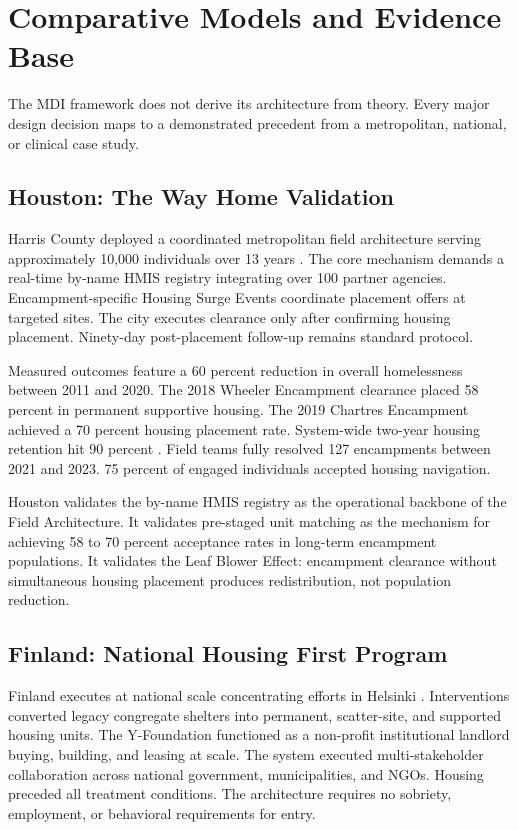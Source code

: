 \documentclass[12pt, letterpaper]{article}
\begin{document}
\clearpage
\section{Comparative Models and Evidence Base}

The MDI framework does not derive its architecture from theory. Every major design decision maps to a demonstrated precedent from a metropolitan, national, or clinical case study.

\subsection{Houston: The Way Home Validation}

Harris County deployed a coordinated metropolitan field architecture serving approximately 10,000 individuals over 13 years \citep{houston_way_home_2024}. The core mechanism demands a real-time by-name HMIS registry integrating over 100 partner agencies. Encampment-specific Housing Surge Events coordinate placement offers at targeted sites. The city executes clearance only after confirming housing placement. Ninety-day post-placement follow-up remains standard protocol.

Measured outcomes feature a 60 percent reduction in overall homelessness between 2011 and 2020. The 2018 Wheeler Encampment clearance placed 58 percent in permanent supportive housing. The 2019 Chartres Encampment achieved a 70 percent housing placement rate. System-wide two-year housing retention hit 90 percent \citep{houston_way_home_2024}. Field teams fully resolved 127 encampments between 2021 and 2023. 75 percent of engaged individuals accepted housing navigation.

Houston validates the by-name HMIS registry as the operational backbone of the Field Architecture. It validates pre-staged unit matching as the mechanism for achieving 58 to 70 percent acceptance rates in long-term encampment populations. It validates the Leaf Blower Effect: encampment clearance without simultaneous housing placement produces redistribution, not population reduction.

\subsection{Finland: National Housing First Program}

Finland executes at national scale concentrating efforts in Helsinki \citep{finland_housing_first_2023}. Interventions converted legacy congregate shelters into permanent, scatter-site, and supported housing units. The Y-Foundation functioned as a non-profit institutional landlord buying, building, and leasing at scale. The system executed multi-stakeholder collaboration across national government, municipalities, and NGOs. Housing preceded all treatment conditions. The architecture requires no sobriety, employment, or behavioral requirements for entry.
\end{document}
